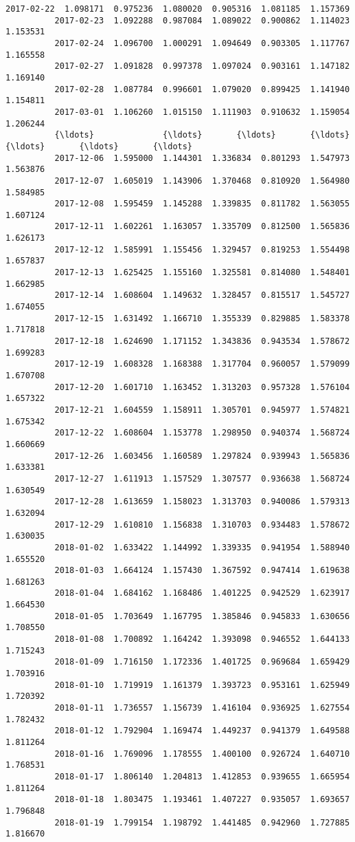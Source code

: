 \documentclass[11pt]{article}
\begin{document}
\begin{Verbatim}[commandchars=\\\{\}]
          2017-02-22  1.098171  0.975236  1.080020  0.905316  1.081185  1.157369   
          2017-02-23  1.092288  0.987084  1.089022  0.900862  1.114023  1.153531   
          2017-02-24  1.096700  1.000291  1.094649  0.903305  1.117767  1.165558   
          2017-02-27  1.091828  0.997378  1.097024  0.903161  1.147182  1.169140   
          2017-02-28  1.087784  0.996601  1.079020  0.899425  1.141940  1.154811   
          2017-03-01  1.106260  1.015150  1.111903  0.910632  1.159054  1.206244   
          {\ldots}              {\ldots}       {\ldots}       {\ldots}       {\ldots}       {\ldots}       {\ldots}   
          2017-12-06  1.595000  1.144301  1.336834  0.801293  1.547973  1.563876   
          2017-12-07  1.605019  1.143906  1.370468  0.810920  1.564980  1.584985   
          2017-12-08  1.595459  1.145288  1.339835  0.811782  1.563055  1.607124   
          2017-12-11  1.602261  1.163057  1.335709  0.812500  1.565836  1.626173   
          2017-12-12  1.585991  1.155456  1.329457  0.819253  1.554498  1.657837   
          2017-12-13  1.625425  1.155160  1.325581  0.814080  1.548401  1.662985   
          2017-12-14  1.608604  1.149632  1.328457  0.815517  1.545727  1.674055   
          2017-12-15  1.631492  1.166710  1.355339  0.829885  1.583378  1.717818   
          2017-12-18  1.624690  1.171152  1.343836  0.943534  1.578672  1.699283   
          2017-12-19  1.608328  1.168388  1.317704  0.960057  1.579099  1.670708   
          2017-12-20  1.601710  1.163452  1.313203  0.957328  1.576104  1.657322   
          2017-12-21  1.604559  1.158911  1.305701  0.945977  1.574821  1.675342   
          2017-12-22  1.608604  1.153778  1.298950  0.940374  1.568724  1.660669   
          2017-12-26  1.603456  1.160589  1.297824  0.939943  1.565836  1.633381   
          2017-12-27  1.611913  1.157529  1.307577  0.936638  1.568724  1.630549   
          2017-12-28  1.613659  1.158023  1.313703  0.940086  1.579313  1.632094   
          2017-12-29  1.610810  1.156838  1.310703  0.934483  1.578672  1.630035   
          2018-01-02  1.633422  1.144992  1.339335  0.941954  1.588940  1.655520   
          2018-01-03  1.664124  1.157430  1.367592  0.947414  1.619638  1.681263   
          2018-01-04  1.684162  1.168486  1.401225  0.942529  1.623917  1.664530   
          2018-01-05  1.703649  1.167795  1.385846  0.945833  1.630656  1.708550   
          2018-01-08  1.700892  1.164242  1.393098  0.946552  1.644133  1.715243   
          2018-01-09  1.716150  1.172336  1.401725  0.969684  1.659429  1.703916   
          2018-01-10  1.719919  1.161379  1.393723  0.953161  1.625949  1.720392   
          2018-01-11  1.736557  1.156739  1.416104  0.936925  1.627554  1.782432   
          2018-01-12  1.792904  1.169474  1.449237  0.941379  1.649588  1.811264   
          2018-01-16  1.769096  1.178555  1.400100  0.926724  1.640710  1.768531   
          2018-01-17  1.806140  1.204813  1.412853  0.939655  1.665954  1.811264   
          2018-01-18  1.803475  1.193461  1.407227  0.935057  1.693657  1.796848   
          2018-01-19  1.799154  1.198792  1.441485  0.942960  1.727885  1.816670   
          

\end{Verbatim}
\end{document}
